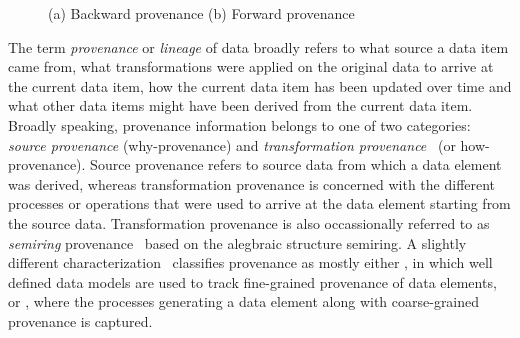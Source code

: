 
\begin{figure}
  \centering
  \label{diag}

  \caption{(a) Backward provenance (b) Forward provenance}

\end{figure}

The term \textit{provenance} or \textit{lineage} of data broadly refers to what source a data item came from, what transformations were applied on the original data to arrive at the current data item, how the current data item has been updated over time and what other data items might have been derived from the current data item. Broadly speaking, provenance information belongs to one of two categories: \textit{source provenance} (why-provenance) and \textit{transformation provenance}~\cite{tan_ieee04} (or how-provenance). Source provenance refers to source data from which a data element was derived, whereas transformation provenance is concerned with the different processes or operations that were used to arrive at the data element starting from the source data. Transformation provenance is also occassionally referred to as \textit{semiring} provenance~\cite{semiring_pods07} based on the alegbraic structure semiring. A slightly different characterization~\cite{ikeda2010panda} classifies provenance as mostly either , in which well defined data models are used to track fine-grained provenance of data elements, or , where the processes generating a data element along with coarse-grained provenance is captured. 

